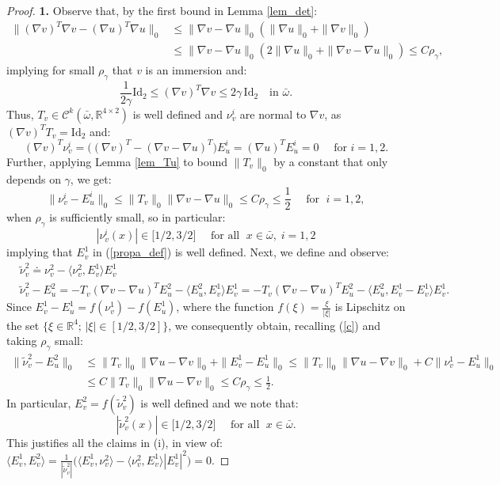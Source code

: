 \documentclass[reqno,twoside,11pt]{amsart}
\newcommand{\Id}{\mathrm{Id}}
\newcommand{\R}{\mathbb{R}}
\numberwithin{equation}{section}
\theoremstyle{plain}
\theoremstyle{definition}
\begin{document}
\begin{proof}
{\bf 1.} Observe that, by the first bound in Lemma \ref{lem_det}:
\begin{equation*}
\begin{split}
\|(\nabla v)^T\nabla v - (\nabla u)^T\nabla u\|_0& \leq \|\nabla
v-\nabla u\|_0(\|\nabla u\|_0+\|\nabla v\|_0) \\ & \leq \|\nabla
v-\nabla u\|_0 (2\|\nabla u\|_0+\|\nabla v-\nabla u\|_0) \leq C \rho_\gamma,
\end{split}
\end{equation*}
implying for small $\rho_\gamma$ that $v$ is an immersion and:
\begin{equation}\label{a}
\frac{1}{2\gamma}\Id_2\leq (\nabla v)^T\nabla v\leq 2\gamma \,\Id_2
\quad\mbox{in } \bar\omega.
\end{equation}
Thus, $T_v\in \mathcal{C}^{k}(\bar\omega, \R^{4\times 2})$
is well defined and $\nu_v^i$ are normal to $\nabla v$, as $(\nabla v)^TT_v=\Id_2$ and:
$$(\nabla v)^T\nu_v^i = \big((\nabla v)^T - (\nabla v-\nabla
u)^T\big)E^i_u=(\nabla u)^TE^i_u=0 \quad\mbox{ for } i=1,2.$$
Further, applying Lemma \ref{lem_Tu} to bound $\|T_v\|_0$ by a
constant that only depends on $\gamma$, we get:
\begin{equation}\label{c}
 \|\nu_v^i- E^i_u\|_0\leq  \|T_v\|_0\|\nabla v-\nabla u\|_0\leq C
\rho_\gamma\leq \frac{1}{2} \quad \mbox{ for }\; i=1,2,
\end{equation}
when $\rho_\gamma$ is sufficiently small, so in particular:
$$ |\nu_v^i(x)|\in \big[{1}/{2}, {3}/{2}\big]\quad 
\mbox{ for all } \; x\in\bar\omega, \;  i=1,2$$
implying that $E^1_v$ in (\ref{propa_def}) is well defined. Next, we define and observe:
\begin{equation}\label{jad}
\begin{split}
&\tilde\nu^2_v\doteq \nu_v^2-\langle \nu_v^2, E_v^1\rangle E_v^1\\
& \tilde\nu^2_v- E_u^2 =- T_v(\nabla v-\nabla u)^TE_u^2 -
\langle E_u^2, E_v^1\rangle E_v^1 = - T_v(\nabla v-\nabla u)^TE_u^2 -
\langle E_u^2, E_v^1-E^1_v\rangle E_v^1.
\end{split}
\end{equation}
Since $E_v^1-E_u^1=f(\nu_v^1)- f(E_u^1)$, where the function $f(\xi) = \frac{\xi}{|\xi|}$ is Lipschitz on the
set $\{\xi\in\R^4;\,|\xi|\in [1/2, 3/2]\}$, we consequently obtain, recalling
(\ref{c}) and taking $\rho_\gamma$ small:
\begin{equation*}
\begin{split}
\|\tilde\nu_v^2-E_u^2\|_0&\leq \|T_v\|_0\|\nabla u-\nabla v\|_0 +
\|E_v^1-E_u^1\|_0\leq \|T_v\|_0\|\nabla u-\nabla v\|_0 +
C\|\nu_v^1-E_u^1\|_0 \\ & \leq C \|T_v\|_0\|\nabla u-\nabla v\|_0\leq
C\rho_\gamma\leq \frac{1}{2}.
\end{split}
\end{equation*}
In particular, $E^2_v=f(\tilde \nu^2_v)$ is well defined and we note that:
$$ |\tilde \nu_v^2(x)|\in \big[{1}/{2}, {3}/{2}\big]\quad 
\mbox{ for all } \; x\in\bar\omega.$$
This justifies all the claims in (i), in view of:
$\langle E_v^1, E_v^2\rangle = \frac{1}{|\tilde \nu^2_v|}\big(\langle E_v^1, \nu_v^2\rangle -
  \langle \nu_v^2, E_v^1\rangle |E^1_v|^2\big)=0.$


\end{proof}
\end{document}
